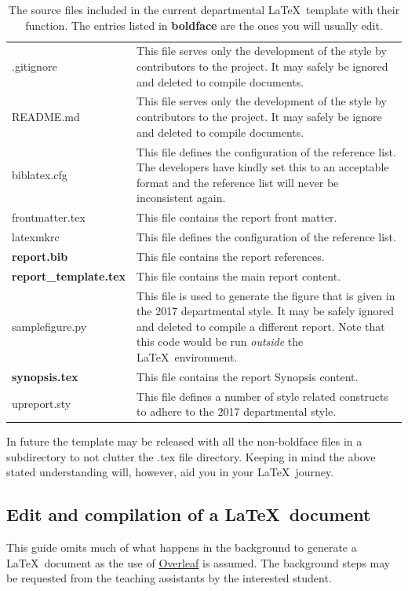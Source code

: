 \documentclass[a4paper,12pt]{article}
\begin{document}
\begin{table}[htbp]
\centering
\caption[Template source files]{The source files included in the current departmental \LaTeX\ template with their function. The entries listed in \textbf{boldface} are the ones you will usually edit.}
\label{tab:sourceFiles}
\begin{tabularx}{1.0\textwidth}{lX}
\toprule
.gitignore & This file serves only the development of the style by contributors to the project. It may safely be ignored and deleted to compile documents.\\
README.md & This file serves only the development of the style by contributors to the project. It may safely be ignore and deleted to compile documents.\\
biblatex.cfg & This file defines the configuration of the reference list. The developers have kindly set this to an acceptable format and the reference list will never be inconsistent again.\\
frontmatter.tex & This file contains the report front matter.\\
latexmkrc & This file defines the configuration of the reference list.\\
\textbf{report.bib} & This file contains the report references.\\
\textbf{report\_template.tex} & This file contains the main report content.\\
samplefigure.py & This file is used to generate the figure that is given in the 2017 departmental style. It may be safely ignored and deleted to compile a different report. Note that this code would be run \textit{outside} the \LaTeX\ environment.\\
\textbf{synopsis.tex} & This file contains the report Synopsis content.\\
upreport.sty & This file defines a number of style related constructs to adhere to the 2017 departmental style.\\
\bottomrule
\end{tabularx}
\end{table}

In future the template may be released with all the non-boldface files in a subdirectory to not clutter the .tex file directory. Keeping in mind the above stated understanding will, however, aid you in your \LaTeX\ journey.

\subsection{Edit and compilation of a \LaTeX\ document}
This guide omits much of what happens in the background to generate a \LaTeX\ document as the use of \href{www.overleaf.com}{Overleaf} is assumed. The background steps may be requested from the teaching assistants by the interested student.
\end{document}
